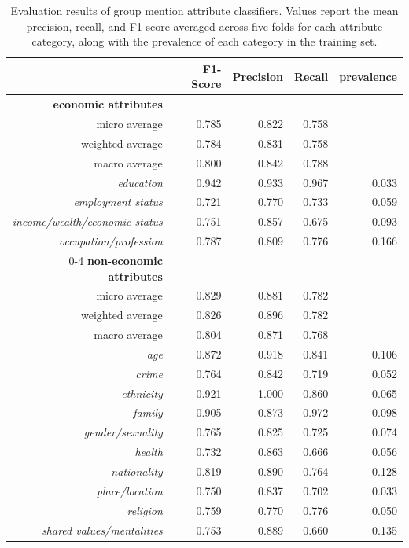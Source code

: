 \begin{table}[!th]
\centering
\caption{Evaluation results of group mention attribute classifiers. Values report the mean precision, recall, and F1-score averaged across five folds for each attribute category, along with the prevalence of each category in the training set.}
\label{table02}
\begin{tabular}{rrrrr}
\toprule
 & F1-Score & Precision & Recall & prevalence \\
\midrule
\textbf{economic attributes} &  &  &  &  \\
micro average & 0.785 & 0.822 & 0.758 &  \\
weighted average & 0.784 & 0.831 & 0.758 &  \\
macro average & 0.800 & 0.842 & 0.788 &  \\
\quad \textit{education} & 0.942 & 0.933 & 0.967 & 0.033 \\
\quad \textit{employment status} & 0.721 & 0.770 & 0.733 & 0.059 \\
\quad \textit{income/wealth/economic status} & 0.751 & 0.857 & 0.675 & 0.093 \\
\quad \textit{occupation/profession} & 0.787 & 0.809 & 0.776 & 0.166 \\
\cmidrule(lr){0-4}
\textbf{non-economic attributes} &  &  &  &  \\
micro average & 0.829 & 0.881 & 0.782 &  \\
weighted average & 0.826 & 0.896 & 0.782 &  \\
macro average & 0.804 & 0.871 & 0.768 &  \\
\quad \textit{age} & 0.872 & 0.918 & 0.841 & 0.106 \\
\quad \textit{crime} & 0.764 & 0.842 & 0.719 & 0.052 \\
\quad \textit{ethnicity} & 0.921 & 1.000 & 0.860 & 0.065 \\
\quad \textit{family} & 0.905 & 0.873 & 0.972 & 0.098 \\
\quad \textit{gender/sexuality} & 0.765 & 0.825 & 0.725 & 0.074 \\
\quad \textit{health} & 0.732 & 0.863 & 0.666 & 0.056 \\
\quad \textit{nationality} & 0.819 & 0.890 & 0.764 & 0.128 \\
\quad \textit{place/location} & 0.750 & 0.837 & 0.702 & 0.033 \\
\quad \textit{religion} & 0.759 & 0.770 & 0.776 & 0.050 \\
\quad \textit{shared values/mentalities} & 0.753 & 0.889 & 0.660 & 0.135 \\
\bottomrule
\end{tabular}
\end{table}